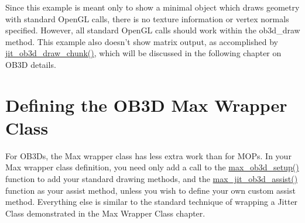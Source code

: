 Since this example is meant only to show a minimal object which draws geometry with standard OpenGL calls, there is no texture information or vertex normals specified. However, all standard OpenGL calls should work within the ob3d\_\-draw method. This example also doesn't show matrix output, as accomplished by \hyperlink{group__ob3dmod_gacb2a2ba1b2bb33377aa10b45bb3a0531}{jit\_\-ob3d\_\-draw\_\-chunk()}, which will be discussed in the following chapter on OB3D details.\hypertarget{chapter_jit_ob3dqs_chapter_jit_ob3dqs_maxwrap}{}\section{Defining the OB3D Max Wrapper Class}\label{chapter_jit_ob3dqs_chapter_jit_ob3dqs_maxwrap}
For OB3Ds, the Max wrapper class has less extra work than for MOPs. In your Max wrapper class definition, you need only add a call to the \hyperlink{group__ob3dmod_ga6bb6d0a3847efb08150eb752257f8be9}{max\_\-ob3d\_\-setup()} function to add your standard drawing methods, and the \hyperlink{group__ob3dmod_ga8fa7e82f9a1f64c2e5d10b2dbf340536}{max\_\-jit\_\-ob3d\_\-assist()} function as your assist method, unless you wish to define your own custom assist method. Everything else is similar to the standard technique of wrapping a Jitter Class demonstrated in the Max Wrapper Class chapter.


